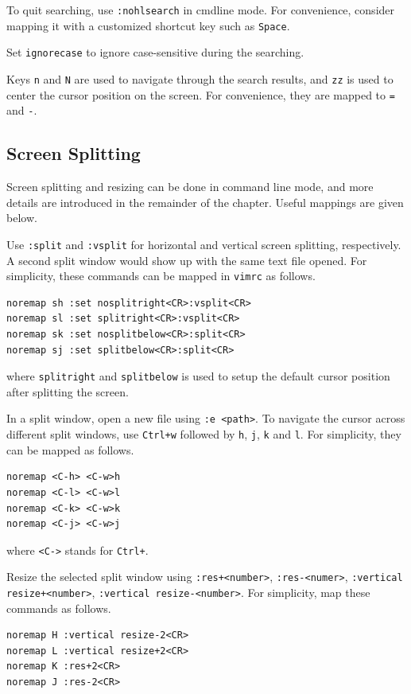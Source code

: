 To quit searching, use \verb|:nohlsearch| in cmdline mode. For convenience, consider mapping it with a customized shortcut key such as \verb|Space|. 

Set \verb|ignorecase| to ignore case-sensitive during the searching.

Keys \verb|n| and \verb|N| are used to navigate through the search results, and \verb|zz| is used to center the cursor position on the screen. For convenience, they are mapped to \verb|=| and \verb|-|.

\subsection{Screen Splitting}

Screen splitting and resizing can be done in command line mode, and more details are introduced in the remainder of the chapter. Useful mappings are given below.

Use \verb|:split| and \verb|:vsplit| for horizontal and vertical screen splitting, respectively. A second split window would show up with the same text file opened. For simplicity, these commands can be mapped in \verb|vimrc| as follows.
\begin{lstlisting}
noremap sh :set nosplitright<CR>:vsplit<CR>
noremap sl :set splitright<CR>:vsplit<CR>
noremap sk :set nosplitbelow<CR>:split<CR>
noremap sj :set splitbelow<CR>:split<CR>
\end{lstlisting}
where \verb|splitright| and \verb|splitbelow| is used to setup the default cursor position after splitting the screen.

In a split window, open a new file using \verb|:e <path>|. To navigate the cursor across different split windows, use \verb|Ctrl+w| followed by \verb|h|, \verb|j|, \verb|k| and \verb|l|. For simplicity, they can be mapped as follows.
\begin{lstlisting}
noremap <C-h> <C-w>h
noremap <C-l> <C-w>l
noremap <C-k> <C-w>k
noremap <C-j> <C-w>j
\end{lstlisting}
where \verb|<C->| stands for \verb|Ctrl+|.

Resize the selected split window using \verb|:res+<number>|, \verb|:res-<numer>|, \verb|:vertical resize+<number>|, \verb|:vertical resize-<number>|. For simplicity, map these commands as follows.
\begin{lstlisting}
noremap H :vertical resize-2<CR>
noremap L :vertical resize+2<CR>
noremap K :res+2<CR>
noremap J :res-2<CR>
\end{lstlisting}

